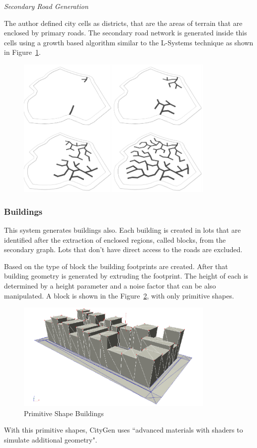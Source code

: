 \emph{Secondary Road Generation}

The author defined city cells as districts, that are the areas of terrain that are enclosed by primary roads. The secondary road network is generated inside this cells using a growth based algorithm similar to the L-Systems technique as shown in Figure~\ref{fig:graphs2}.

\begin{figure}[htbp]
	\centering
	\includegraphics[width=0.85\textwidth]{img/CityGen/SecondaryRoadGrowth.png}
	\caption{}
	\label{fig:graphs2}
\end{figure}



\subsubsection{Buildings} %
\label{ssub:buildings}



This system generates buildings also. Each building is created in lots that are identified after the extraction of enclosed regions, called blocks, from the secondary graph. Lots that don't have direct access to the roads are excluded. 


Based on the type of block the building footprints are created. After that building geometry is generated by extruding the footprint. The height of each is determined by a height parameter and a noise factor that can be also manipulated. A block is shown in the Figure~\ref{fig:primitiveShapes}, with only primitive shapes.

\begin{figure}[htbp]
	\centering
	\includegraphics[width=0.85\textwidth]{img/CityGen/BockPrimitiveShapes.png}
	\caption{Primitive Shape Buildings}
	\label{fig:primitiveShapes}
\end{figure}

With this primitive shapes, CityGen uses ``advanced materials with shaders to simulate additional geometry".



